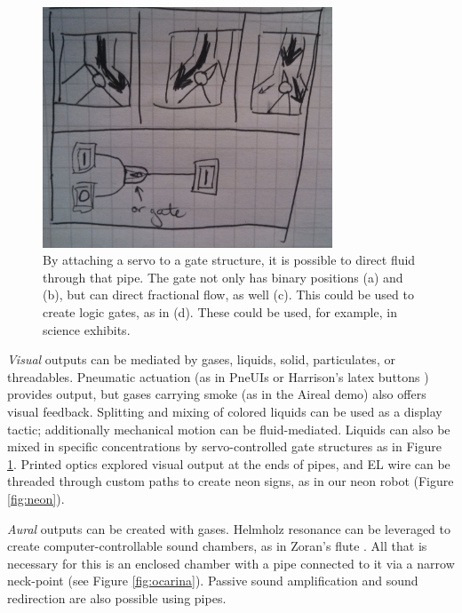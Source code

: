 \begin{figure}[h]
\centering
    \includegraphics[width=3.4in]{figures/placeholder/direct.jpg}
\caption{By attaching a servo to a gate structure, it is possible to direct fluid through that pipe.  The gate not only has binary positions (a) and (b), but can direct fractional flow, as well (c).  This could be used to create logic gates, as in (d).  These could be used, for example, in science exhibits.}
\label{fig:direct}
\end{figure}

\emph{Visual} outputs can be mediated by gases, liquids, solid, particulates, or threadables.  Pneumatic actuation (as in PneUIs \cite{Yao-pneui} or Harrison's latex buttons \cite{Harrison-buttons}) provides output, but gases carrying smoke (as in the Aireal \cite{Sodhi-aireal} demo) also offers visual feedback.  Splitting and mixing of colored liquids can be used as a display tactic; additionally mechanical motion can be fluid-mediated.  Liquids can also be mixed in specific concentrations by servo-controlled gate structures as in Figure \ref{fig:direct}.  Printed optics \cite{Willis-printedoptics} explored visual output at the ends of pipes, and  EL wire can be threaded through custom paths to create neon signs, as in our neon robot (Figure \ref{fig:neon}).

\emph{Aural} outputs can be created with gases.  Helmholz resonance can be leveraged to create computer-controllable sound chambers, as in Zoran's flute \cite{Zoran-flute}.  All that is necessary for this is an enclosed chamber with a pipe connected to it via a narrow neck-point (see Figure \ref{fig:ocarina}).  Passive sound amplification and sound redirection are also possible using pipes.

